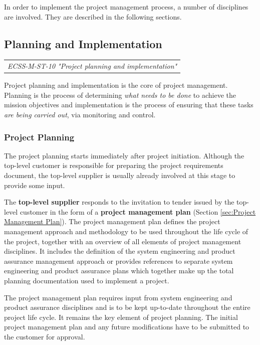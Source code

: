 In order to implement the project management process, a number of disciplines are involved. They are described in the following sections.

\subsection{Planning and Implementation}

\begin{tabular}{l}
\textit{ECSS-M-ST-10 "Project planning and implementation" \cite{ECSS-M-ST-10}}
\end{tabular}

Project planning and implementation is the core of project management. Planning is the process of determining \emph{what needs to be done} to achieve the mission objectives and implementation is the process of ensuring that these tasks \emph{are being carried out}, via monitoring and control.

\subsubsection{Project Planning}

The project planning starts immediately after project initiation. Although the top-level customer is responsible for preparing the project requirements document, the top-level supplier is usually already involved at this stage to provide some input.

The \textbf{top-level supplier} responds to the invitation to tender issued by the top-level customer in the form of a \textbf{project management plan} (Section \ref{sec:Project Management Plan}). The project management plan defines the project management approach and methodology to be used throughout the life cycle of the project, together with an overview of all elements of project management disciplines. It includes the definition of the system engineering and product assurance management approach or provides references to separate system engineering and product assurance plans which together make up the total planning documentation used to implement a project.

The project management plan requires input from system engineering and product assurance disciplines and is to be kept up-to-date throughout the entire project life cycle. It remains the key element of project planning. The initial project management plan and any future modifications have to be submitted to the customer for approval.

